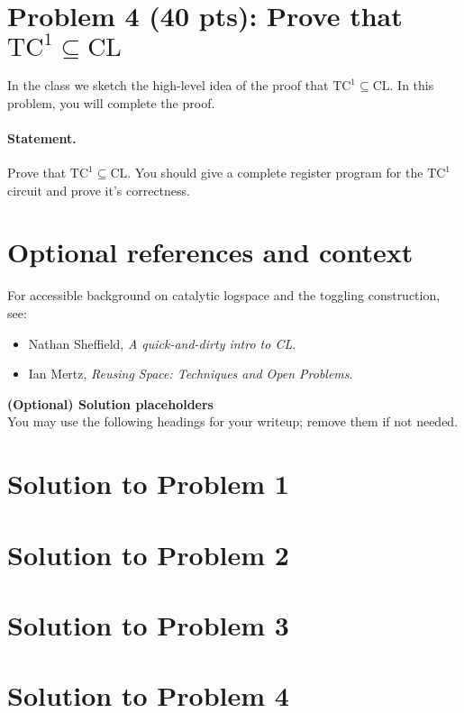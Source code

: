 \documentclass[12pt]{article}
\newcommand{\TCone}{\text{TC}^1}
\begin{document}
\newpage

\section{Problem 4 (40 pts): Prove that \texorpdfstring{$\TCone \subseteq \mathrm{CL}$}{TC$^1$ ⊆ CL}}

In the class we sketch the high-level idea of the proof that $\TCone \subseteq \mathrm{CL}$. In this problem, you will complete the proof.

\paragraph{Statement.}
Prove that $\TCone \subseteq \mathrm{CL}$. You should give a complete register program for the $\TCone$ circuit and prove it's correctness.

\newpage

\section*{Optional references and context}
For accessible background on catalytic logspace and the toggling construction, see:
\begin{itemize}
    \item Nathan Sheffield, \emph{A quick-and-dirty intro to CL}.
    \item Ian Mertz, \emph{Reusing Space: Techniques and Open Problems}.
\end{itemize}

\vfill
\noindent\textbf{(Optional) Solution placeholders}\\
You may use the following headings for your writeup; remove them if not needed.

\newpage
\section*{Solution to Problem 1}

\newpage
\section*{Solution to Problem 2}

\newpage
\section*{Solution to Problem 3}

\newpage
\section*{Solution to Problem 4}
\end{document}
